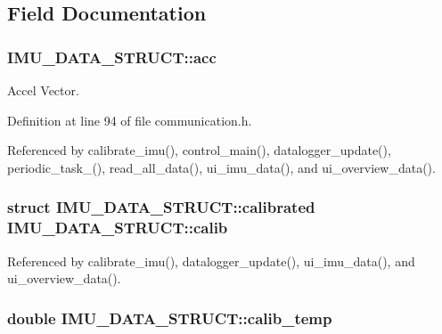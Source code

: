 \subsection{Field Documentation}
\hypertarget{structIMU__DATA__STRUCT_a448f284bf44eb503affda586ad5fa9d2}{
\subsubsection[{acc}]{ I\-M\-U\-\_\-\-D\-A\-T\-A\-\_\-\-S\-T\-R\-U\-C\-T\-::acc}}\label{structIMU__DATA__STRUCT_a448f284bf44eb503affda586ad5fa9d2}


Accel Vector. 



Definition at line 94 of file communication.\-h.



Referenced by calibrate\-\_\-imu(), control\-\_\-main(), datalogger\-\_\-update(), periodic\-\_\-task\-\_(), read\-\_\-all\-\_\-data(), ui\-\_\-imu\-\_\-data(), and ui\-\_\-overview\-\_\-data().

\hypertarget{structIMU__DATA__STRUCT_aeffe3c3c5a7191a5cef16e7aab6c3795}{
\subsubsection[{calib}]{\setlength{\rightskip}{0pt plus 5cm}struct {\bf I\-M\-U\-\_\-\-D\-A\-T\-A\-\_\-\-S\-T\-R\-U\-C\-T\-::calibrated} I\-M\-U\-\_\-\-D\-A\-T\-A\-\_\-\-S\-T\-R\-U\-C\-T\-::calib}}\label{structIMU__DATA__STRUCT_aeffe3c3c5a7191a5cef16e7aab6c3795}


Referenced by calibrate\-\_\-imu(), datalogger\-\_\-update(), ui\-\_\-imu\-\_\-data(), and ui\-\_\-overview\-\_\-data().

\hypertarget{structIMU__DATA__STRUCT_a3553fcee6beba17fe0c7711ac0483875}{
\subsubsection[{calib\-\_\-temp}]{\setlength{\rightskip}{0pt plus 5cm}double I\-M\-U\-\_\-\-D\-A\-T\-A\-\_\-\-S\-T\-R\-U\-C\-T\-::calib\-\_\-temp}}\label{structIMU__DATA__STRUCT_a3553fcee6beba17fe0c7711ac0483875}



